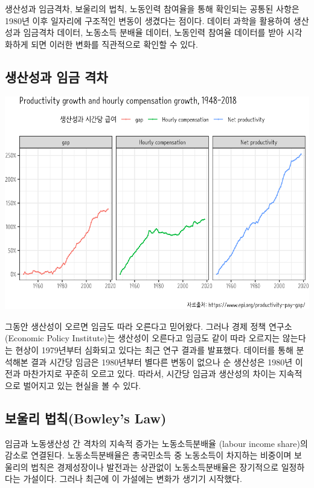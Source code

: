 \documentclass[smallextended]{svjour3}       %
\begin{document}
생산성과 임금격차, 보울리의 법칙, 노동인력 참여율을 통해 확인되는 공통된
사항은 1980년 이후 일자리에 구조적인 변동이 생겼다는 점이다. 데이터
과학을 활용하여 생산성과 임금격차 데이터, 노동소득 분배율 데이터,
노동인력 참여율 데이터를 받아 시각화하게 되면 이러한 변화를 직관적으로
확인할 수 있다.

\hypertarget{wage-productivity-gap}{%
\subsection{생산성과 임금 격차}\label{wage-productivity-gap}}

\begin{center}\includegraphics[width=1\linewidth]{paper_files/figure-latex/productivity-gap-1} \end{center}

그동안 생산성이 오르면 임금도 따라 오른다고 믿어왔다. 그러나 경제 정책
연구소 (Economic Policy
Institute)\cite{economic_policy_institute_2019}는 생산성이 오른다고
임금도 같이 따라 오르지는 않는다는 현상이 1979년부터 심화되고 있다는
최근 연구 결과를 발표했다. 데이터\cite{bivens2014raising}를 통해
분석해본 결과 시간당 임금은 1980년부터 별다른 변동이 없으나 순 생산성은
1980년 이전과 마찬가지로 꾸준히 오르고 있다. 따라서, 시간당 임금과
생산성의 차이는 지속적으로 벌어지고 있는 현실을 볼 수 있다.

\hypertarget{bowley-law}{%
\subsection{보울리 법칙(Bowley's Law)}\label{bowley-law}}

임금과 노동생산성 간 격차의 지속적 증가는 노동소득분배율 (labour income
share)의 감소로 연결된다. 노동소득분배율은 총국민소득 중 노동소득이
차지하는 비중이며 보울리의 법칙은 경제성장이나 발전과는 상관없이
노동소득분배율은 장기적으로 일정하다는 가설\cite{lee_2014}이다. 그러나
최근에 이 가설에는 변화가 생기기 시작했다.
\end{document}
